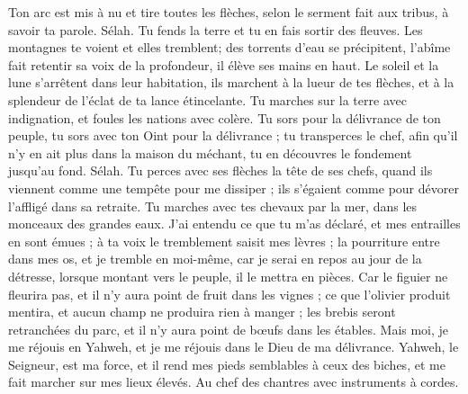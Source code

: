 \begin{multicols}{2}
Ton arc est mis à nu et tire toutes les flèches, selon le serment fait aux tribus, à savoir ta parole. Sélah. Tu fends la terre et tu en fais sortir des fleuves.
Les montagnes te voient et elles tremblent; des torrents d’eau se précipitent, l'abîme fait retentir sa voix de la profondeur, il élève ses mains en haut.
Le soleil et la lune s'arrêtent dans leur habitation, ils marchent à la lueur de tes flèches, et à la splendeur de l'éclat de ta lance étincelante.
Tu marches sur la terre avec indignation, et foules les nations avec colère.
Tu sors pour la délivrance de ton peuple, tu sors avec ton Oint pour la délivrance ; tu transperces le chef, afin qu'il n'y en ait plus dans la maison du méchant, tu en découvres le fondement jusqu’au fond. Sélah.
Tu perces avec ses flèches la tête de ses chefs, quand ils viennent comme une tempête pour me dissiper ; ils s'égaient comme pour dévorer l'affligé dans sa retraite.
Tu marches avec tes chevaux par la mer, dans les monceaux des grandes eaux.
J'ai entendu ce que tu m'as déclaré, et mes entrailles en sont émues ; à ta voix le tremblement saisit mes lèvres ; la pourriture entre dans mes os, et je tremble en moi-même, car je serai en repos au jour de la détresse, lorsque montant vers le peuple, il le mettra en pièces.
Car le figuier ne fleurira pas, et il n'y aura point de fruit dans les vignes ; ce que l'olivier produit mentira, et aucun champ ne produira rien à manger ; les brebis seront retranchées du parc, et il n'y aura point de bœufs dans les étables.
Mais moi, je me réjouis en Yahweh, et je me réjouis dans le Dieu de ma délivrance.
Yahweh, le Seigneur, est ma force, et il rend mes pieds semblables à ceux des biches, et me fait marcher sur mes lieux élevés. Au chef des chantres avec instruments à cordes.
\PPE{}
\end{multicols}
